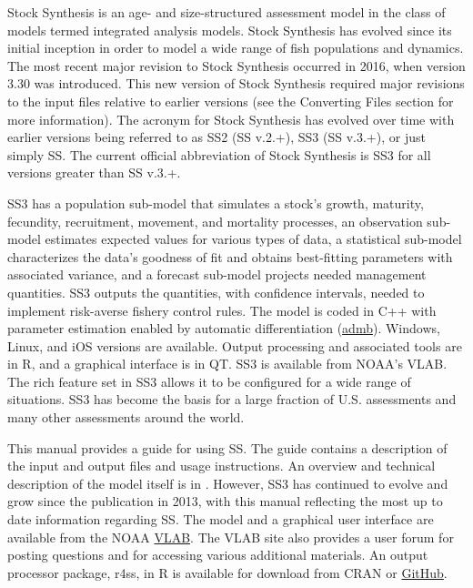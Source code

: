 Stock Synthesis is an age- and size-structured assessment model in the class of models termed integrated analysis models. Stock Synthesis has evolved since its initial inception in order to model a wide range of fish populations and dynamics.  The most recent major revision to Stock Synthesis occurred in 2016, when version 3.30 was introduced. This new version of Stock Synthesis required major revisions to the input files relative to earlier versions (see the \hypertarget{ConvIssues}{Converting Files} section for more information). The acronym for Stock Synthesis has evolved over time with earlier versions being referred to as SS2 (SS v.2.+), SS3 (SS v.3.+), or just simply SS.  The current official abbreviation of Stock Synthesis is SS3 for all versions greater than SS v.3.+. 


SS3 has a population sub-model that simulates a stock's growth, maturity, fecundity, recruitment, movement, and mortality processes, an observation sub-model estimates expected values for various types of data, a statistical sub-model characterizes the data’s goodness of fit and obtains best-fitting parameters with associated variance, and a forecast sub-model projects needed management quantities.  SS3 outputs the quantities, with confidence intervals, needed to implement risk-averse fishery control rules. The model is coded in C++ with parameter estimation enabled by automatic differentiation (\href{http://www.admb-project.org}{admb}).  Windows, Linux, and iOS versions are available.  Output processing and associated tools are in R, and a graphical interface is in QT.  SS3 is available from NOAA’s VLAB. The rich feature set in SS3 allows it to be configured for a wide range of situations.  SS3 has become the basis for a large fraction of U.S. assessments and many other assessments around the world.  

This manual provides a guide for using SS. The guide contains a description of the input and output files and usage instructions. An overview and technical description of the model itself is in \citet{methotstock2013}. However, SS3 has continued to evolve and grow since the publication in 2013, with this manual reflecting the most up to date information regarding SS.  The model and a graphical user interface are available from the NOAA \href{https://vlab.noaa.gov/group/stock-synthesis/home}{VLAB}. The VLAB site also provides a user forum for posting questions and for accessing various additional materials.  An output processor package, r4ss, in R is available for download from CRAN or \href{https://github.com/r4ss/r4ss}{GitHub}.

